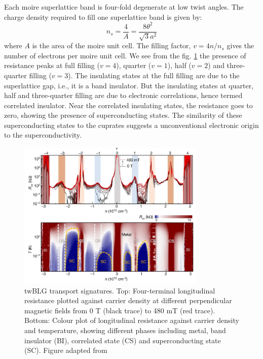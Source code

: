 Each moire superlattice band is four-fold degenerate at low twist angles. The charge density required to fill one superlattice band is given by:
\begin{equation}
    n_s=\frac{4}{A}=\frac{8\theta^2}{\sqrt{3}a^2}
\end{equation}
where $A$ is the area of the moire unit cell. The filling factor, $v=4n/n_s$ gives the number of electrons per moire unit cell. We see from the fig. \ref{fig:twBLG} the presence of resistance peaks at full filling ($v=4$), quarter ($v=1$), half ($v=2$) and three-quarter filling ($v=3$). The insulating states at the full filling are due to the superlattice gap, i.e., it is a band insulator. But the insulating states at quarter, half and three-quarter filling are due to electronic correlations, hence termed correlated insulator. Near the correlated insulating states, the resistance goes to zero, showing the presence of superconducting states. The similarity of these superconducting states to the cuprates suggests a unconventional electronic origin to the superconductivity.

 \begin{figure}[H]
        \centering
         \includegraphics[width=0.8\textwidth]{figures/res_phase.jpg}
         \caption{twBLG transport signatures. Top:  Four-terminal longitudinal resistance plotted against carrier density at different perpendicular magnetic fields from 0 T (black trace) to 480 mT (red trace). Bottom:  Colour plot of longitudinal resistance against carrier density and temperature, showing different phases including metal, band insulator (BI), correlated state (CS) and superconducting state (SC). Figure adapted from \cite{Lu2019}}
         \label{fig:twBLG}
\end{figure}